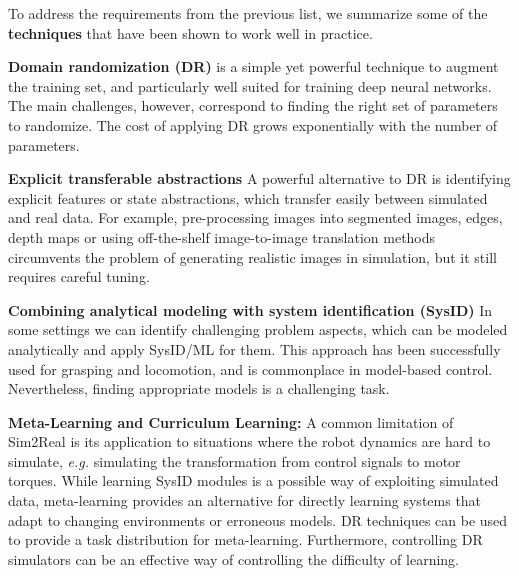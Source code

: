 To address the requirements from the previous list, we summarize some of the {\bf techniques} that have been shown to work well in practice.


{\bf Domain randomization (DR)} is a simple yet powerful technique to augment the training set, and particularly well suited for training deep neural networks. The main challenges, however, correspond to finding the right set of parameters to randomize. The cost of applying DR grows exponentially with the number of parameters.%

{\bf Explicit transferable abstractions} A powerful alternative to DR is identifying explicit features or state abstractions, which transfer easily between simulated and real data. For example, pre-processing images into segmented images, edges, depth maps or using off-the-shelf image-to-image translation methods circumvents the problem of generating realistic images in simulation, but it still requires careful tuning. %

{\bf Combining analytical modeling with system identification (SysID)} In some settings we can identify challenging problem aspects, which can be modeled analytically and apply SysID/ML for them. This approach has been successfully used for grasping and locomotion, and is commonplace in model-based control. Nevertheless, finding appropriate models is a challenging task. 

{\bf Meta-Learning and Curriculum Learning:} A common limitation of Sim2Real is its application to situations where the robot dynamics are hard to simulate, \emph{e.g.} simulating the transformation from control signals to motor torques. While learning SysID modules is a possible way of exploiting simulated data, meta-learning provides an alternative for directly learning systems that adapt to changing environments or erroneous models. DR techniques can be used to provide a task distribution for meta-learning. Furthermore, controlling DR simulators can be an effective way of controlling the difficulty of learning. 

